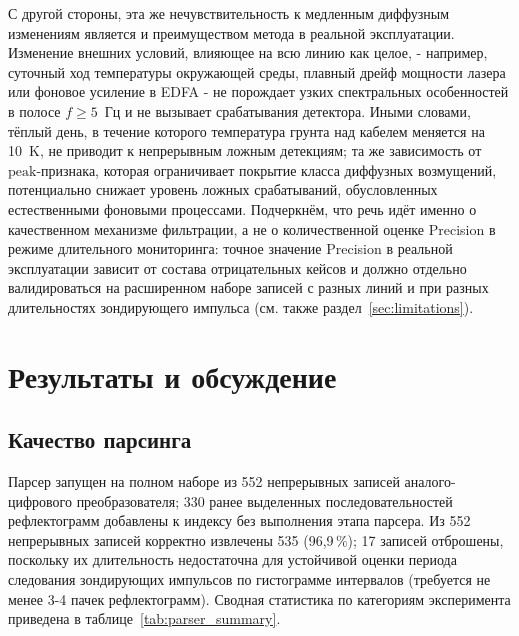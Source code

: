 \documentclass[12pt,a4paper]{extarticle}
\begin{document}
С другой стороны, эта же нечувствительность к медленным диффузным изменениям является и преимуществом метода в реальной эксплуатации. Изменение внешних условий, влияющее на всю линию как целое, - например, суточный ход температуры окружающей среды, плавный дрейф мощности лазера или фоновое усиление в EDFA - не порождает узких спектральных особенностей в полосе $f \ge 5$~Гц и не вызывает срабатывания детектора. Иными словами, тёплый день, в течение которого температура грунта над кабелем меняется на 10~K, не приводит к непрерывным ложным детекциям; та же зависимость от $\mathrm{peak}$-признака, которая ограничивает покрытие класса диффузных возмущений, потенциально снижает уровень ложных срабатываний, обусловленных естественными фоновыми процессами. Подчеркнём, что речь идёт именно о качественном механизме фильтрации, а не о количественной оценке Precision в режиме длительного мониторинга: точное значение Precision в реальной эксплуатации зависит от состава отрицательных кейсов и должно отдельно валидироваться на расширенном наборе записей с разных линий и при разных длительностях зондирующего импульса (см. также раздел~\ref{sec:limitations}).

\newpage

\section{Результаты и обсуждение}

\subsection{Качество парсинга}
\label{sec:parser_quality}

Парсер запущен на полном наборе из 552 непрерывных записей аналого-цифрового преобразователя; 330 ранее выделенных последовательностей рефлектограмм добавлены к индексу без выполнения этапа парсера. Из 552 непрерывных записей корректно извлечены 535 (96{,}9\,\%); 17 записей отброшены, поскольку их длительность недостаточна для устойчивой оценки периода следования зондирующих импульсов по гистограмме интервалов (требуется не менее 3-4 пачек рефлектограмм). Сводная статистика по категориям эксперимента приведена в таблице~\ref{tab:parser_summary}.
\end{document}
